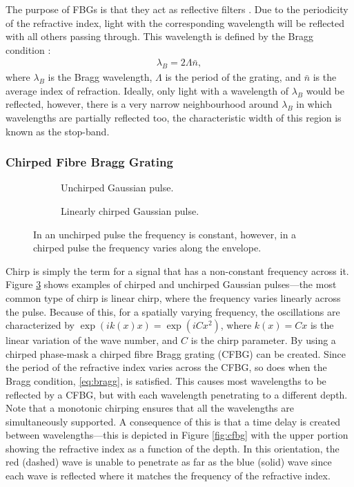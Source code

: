 The purpose of FBGs is that they act as reflective filters \cite{agrawal2002, alazzawi, ferreira, starodoumov}. Due to the periodicity of the refractive index, light with the corresponding wavelength will be reflected with all others passing through. This wavelength is defined by the Bragg condition \cite{agrawal2002, alazzawi, becker, ferreira, silfvast, starodoumov}:
\begin{align}
\label{eq:bragg}
\lambda_B = 2 \Lambda \bar{n},
\end{align}
where $\lambda_B$ is the Bragg wavelength, $\Lambda$ is the period of the grating, and $\bar{n}$ is the average index of refraction. Ideally, only light with a wavelength of $\lambda_B$ would be reflected, however, there is a very narrow neighbourhood around $\lambda_B$ in which wavelengths are partially reflected too, the characteristic width of this region is known as the stop-band. \\

\subsubsection{Chirped Fibre Bragg Grating}
\begin{figure}[tbp]
\begin{subfigure}{0.5\textwidth}

\caption{Unchirped Gaussian pulse.}
\label{fig:unchirped}
\end{subfigure}
\begin{subfigure}{0.5\textwidth}

\caption{Linearly chirped Gaussian pulse.}
\label{fig:chirped}
\end{subfigure}
\caption[Comparison of a chirped and unchirped Gaussian pulse.]{In an unchirped pulse the frequency is constant, however, in a chirped pulse the frequency varies along the envelope.}
\label{fig:chirp}
\end{figure}

Chirp is simply the term for a signal that has a non-constant frequency across it. Figure \ref{fig:chirp} shows examples of chirped and unchirped Gaussian pulses---the most common type of chirp is linear chirp, where the frequency varies linearly across the pulse. Because of this, for a spatially varying frequency, the oscillations are characterized by $\exp \left( i k(x) x \right) = \exp \left( i C x^2 \right)$, where $k(x) = Cx$ is the linear variation of the wave number, and $C$ is the chirp parameter. By using a chirped phase-mask a chirped fibre Bragg grating (CFBG) can be created. Since the period of the refractive index varies across the CFBG, so does when the Bragg condition, \eqref{eq:bragg}, is satisfied. This causes most wavelengths to be reflected by a CFBG, but with each wavelength penetrating to a different depth. Note that a monotonic chirping ensures that all the wavelengths are simultaneously supported. A consequence of this is that a time delay is created between wavelengths---this is depicted in Figure \ref{fig:cfbg} with the upper portion showing  the refractive index as a function of the depth. In this orientation, the red (dashed) wave is unable to penetrate as far as the blue (solid) wave since each wave is reflected where it matches the frequency of the refractive index.  \\

